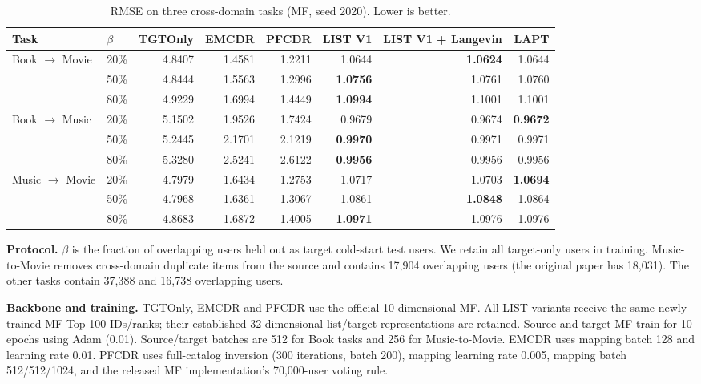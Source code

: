 \documentclass[10pt]{article}
\begin{document}
\begin{table}[htbp]
\centering
\caption{RMSE on three cross-domain tasks (MF, seed 2020). Lower is better.}
\small
\setlength{\tabcolsep}{4pt}
\begin{tabular}{llrrrrrr}
\toprule
Task & $\beta$ & TGTOnly & EMCDR & PFCDR & LIST V1 & LIST V1 + Langevin & LAPT \\
\midrule
Book $\rightarrow$ Movie & 20\% & 4.8407 & 1.4581 & 1.2211 & 1.0644 & \textbf{1.0624} & 1.0644 \\
 & 50\% & 4.8444 & 1.5563 & 1.2996 & \textbf{1.0756} & 1.0761 & 1.0760 \\
 & 80\% & 4.9229 & 1.6994 & 1.4449 & \textbf{1.0994} & 1.1001 & 1.1001 \\
\midrule
Book $\rightarrow$ Music & 20\% & 5.1502 & 1.9526 & 1.7424 & 0.9679 & 0.9674 & \textbf{0.9672} \\
 & 50\% & 5.2445 & 2.1701 & 2.1219 & \textbf{0.9970} & 0.9971 & 0.9971 \\
 & 80\% & 5.3280 & 2.5241 & 2.6122 & \textbf{0.9956} & 0.9956 & 0.9956 \\
\midrule
Music $\rightarrow$ Movie & 20\% & 4.7979 & 1.6434 & 1.2753 & 1.0717 & 1.0703 & \textbf{1.0694} \\
 & 50\% & 4.7968 & 1.6361 & 1.3067 & 1.0861 & \textbf{1.0848} & 1.0864 \\
 & 80\% & 4.8683 & 1.6872 & 1.4005 & \textbf{1.0971} & 1.0976 & 1.0976 \\
\bottomrule
\end{tabular}
\end{table}
\par\medskip\par\medskip\footnotesize
\noindent\textbf{Protocol.} $\beta$ is the fraction of overlapping users held out as target cold-start test users. We retain all target-only users in training. Music-to-Movie removes cross-domain duplicate items from the source and contains 17,904 overlapping users (the original paper has 18,031). The other tasks contain 37,388 and 16,738 overlapping users.
\par\smallskip\noindent\textbf{Backbone and training.} TGTOnly, EMCDR and PFCDR use the official 10-dimensional MF. All LIST variants receive the same newly trained MF Top-100 IDs/ranks; their established 32-dimensional list/target representations are retained. Source and target MF train for 10 epochs using Adam (0.01). Source/target batches are 512 for Book tasks and 256 for Music-to-Movie. EMCDR uses mapping batch 128 and learning rate 0.01. PFCDR uses full-catalog inversion (300 iterations, batch 200), mapping learning rate 0.005, mapping batch 512/512/1024, and the released MF implementation's 70,000-user voting rule.
\end{document}
